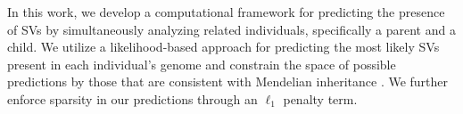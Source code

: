 	In this work, we develop a computational framework for predicting the presence of SVs by simultaneously analyzing related individuals, specifically a parent and a child. We utilize a likelihood-based approach for predicting the most likely SVs present in each individual’s genome and constrain the space of possible predictions by those that are consistent with Mendelian inheritance \cite{alliance2010understanding}. We further enforce sparsity in our predictions through an $\ell_1$ penalty term.
		

